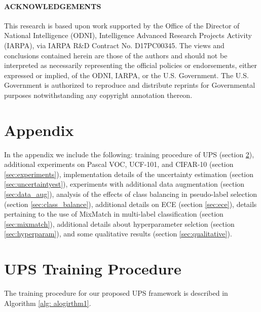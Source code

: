 \documentclass{article} \usepackage{iclr2021_conference,times}
\begin{document}
\paragraph{ACKNOWLEDGEMENTS}
This research is based upon work supported by the Office of the Director of National Intelligence (ODNI), Intelligence Advanced Research Projects Activity (IARPA), via IARPA R\&D Contract No. D17PC00345. The views and conclusions contained herein are those of the authors and should not be interpreted as necessarily representing the official policies or endorsements, either expressed or implied, of the ODNI, IARPA, or the U.S. Government. The U.S. Government is authorized to reproduce and distribute reprints for Governmental purposes notwithstanding any copyright annotation thereon.






\appendix
\section{Appendix}

In the appendix we include the following: training procedure of UPS (section \ref{sec:algorithm}), additional experiments on Pascal VOC, UCF-101, and CIFAR-10 (section \ref{sec:experiments}), implementation details of the uncertainty estimation  (section \ref{sec:uncertaintyest}), experiments with additional data augmentation (section \ref{sec:data_aug}), analysis of the effects of class balancing in pseudo-label selection (section \ref{sec:class_balance}), additional details on ECE (section \ref{sec:ece}), details pertaining to the use of MixMatch in multi-label classification (section \ref{sec:mixmatch}), additional details about hyperparameter selction (section \ref{sec:hyperparam}), and some qualitative results (section \ref{sec:qualitative}).

\section{UPS Training Procedure}
\label{sec:algorithm}
The training procedure for our proposed UPS framework is described in Algorithm \ref{alg: alogirthm1}.
\end{document}
